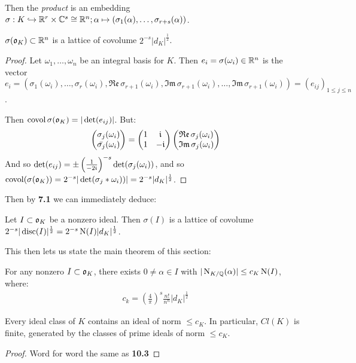 \documentclass[10pt,a4paper]{article}
\begin{document}
Then the \emph{product} is an embedding $\sigma:K \hookrightarrow \mathbb{R}^r\times \mathbb{C}^s \cong \mathbb{R}^n; \alpha\mapsto (\sigma_1(\alpha), \ldots, \sigma_{r+s}(\alpha))$.

\begin{proposition}
$\sigma(\mathfrak{o}_K) \subset \mathbb{R}^n$ is a lattice of covolume $2^{-s}|d_K|^{\frac12}$.
\end{proposition}
\begin{proof}
Let $\omega_1, \ldots, \omega_n$ be an integral basis for $K$. Then $e_i = \sigma(\omega_i) \in \mathbb{R}^n$ is the vector $e_i = (\sigma_1(\omega_i), \ldots, \sigma_r(\omega_i), \mathfrak{Re}\,\sigma_{r+1}(\omega_i), \mathfrak{Im}\,\sigma_{r+1}(\omega_i), \ldots, \mathfrak{Im}\,\sigma_{r+1}(\omega_i)) = (e_{ij})_{1\leq j \leq n}$.

Then $\operatorname{covol} \sigma(\mathfrak{o}_K) = |\det(e_{ij})|$. But:
\begin{align*}
\begin{pmatrix}
\sigma_j(\omega_i) \\ \bar{\sigma_j}(\omega_i)
\end{pmatrix} = \begin{pmatrix}
1 & \mathfrak{i} \\ 1 & -\mathfrak{i}
\end{pmatrix}\begin{pmatrix}
\mathfrak{Re}\,\sigma_j(\omega_i)\\\mathfrak{Im}\,\sigma_j(\omega_i)
\end{pmatrix}
\end{align*}
And so $\det(e_{ij}) = \pm\left(\frac{1}{-2\mathfrak{i}}\right)^{-s}\det(\sigma_j(\omega_i))$, and so $\operatorname{covol}(\sigma(\mathfrak{o}_K)) = 2^{-s}|\det(\sigma_j*\omega_i))| = 2^{-s}|d_K|^{\frac12}$.
\end{proof}

Then by \textbf{7.1} we can immediately deduce:
\begin{corollary}
Let $I \subset \mathfrak{o}_K$ be a nonzero ideal. Then $\sigma(I)$ is a lattice of covolume $2^{-s}|\operatorname{disc}(I)|^{\frac12} = 2^{-s}\operatorname{N}(I)|d_K|^{\frac12}$.
\end{corollary}
This then lets us state the main theorem of this section:
\begin{theorem}
For any nonzero $I \subset \mathfrak{o}_K$, there exists $0 \neq \alpha \in I$ with $|\operatorname{N}_{K/\mathbb{Q}}(\alpha)| \leq c_K\operatorname{N}(I)$, where:
\begin{align*}
c_k = \left(\frac{4}{\pi}\right)^s \frac{n!}{n^n}|d_K|^{\frac12}
\end{align*}
\end{theorem}
\begin{corollary}
Every ideal class of $K$ contains an ideal of norm $\leq c_K$. In particular, $Cl(K)$ is finite, generated by the classes of prime ideals of norm $\leq c_K$.
\end{corollary}
\begin{proof}
Word for word the same as \textbf{10.3}
\end{proof}
\end{document}

